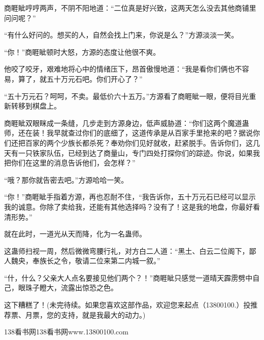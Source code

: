 \begin{this_body}
商睚眦哼哼两声，不阴不阳地道：“二位真是好兴致，这两天怎么没去其他商铺里问问呢？”

“有什么好问的。想买的人，自然会找上门来，你说是么？”方源淡淡一笑。

“你！”商睚眦顿时大怒，方源的态度让他很不爽。

他咬了咬牙，艰难地将心中的情绪压下，昂首傲慢地道：“我是看你们俩也不容易，算了，就五十万元石吧。你们开心了？”

“五十万元石？呵呵，不卖。最低价六十五万。”方源看了商睚眦一眼，便将目光重新转移到棋盘上。

商睚眦双眼眯成一条缝，几步走到方源身边，低声威胁道：“你们这两个魔道蛊师，还在装！我早就查过你们的底细了，这道传承是从百家手里抢来的吧？据说你们还把百家的两个少族长都杀死？奉劝你们见好就收，赶紧脱手。告诉你们，这几天有一只铁家队伍，已经到达了商量山，专门四处打探你们的踪迹。你说，如果我把你们在这里的消息告诉他们，会怎样？”

“哦？那你就告密去吧。”方源哈哈一笑。

“你！”商睚眦手指着方源，再也忍耐不住，“我告诉你，五十万元石已经可以显示我的诚意。你除了卖给我，还能有其他选择吗？没有了！这是我的地盘，你最好看清形势。”

就在此时，一道光从天而降，化为一名蛊师。

这蛊师扫视一周，然后微微弯腰行礼，对方白二人道：“黑土、白云二位阁下，鄙人魏央，奉族长之令，敬请二位来第二内城一叙。”

“什，什么？父亲大人点名要接见他们两个？！”商睚眦只感觉一道晴天霹雳劈中自己，眼珠子瞪大，流露出惊恐之色。

这下糟糕了！(未完待续。如果您喜欢这部作品，欢迎您来起点（13800100.）投推荐票、月票，您的支持，就是我最大的动力。)

138看书网138看书网www.13800100.com

\end{this_body}

